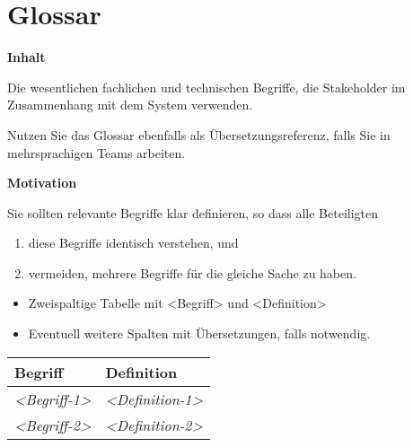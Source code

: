 \hypertarget{glossar}{%
\section{Glossar}\label{glossar}}

\textbf{Inhalt}

Die wesentlichen fachlichen und technischen Begriffe, die Stakeholder im
Zusammenhang mit dem System verwenden.

Nutzen Sie das Glossar ebenfalls als Übersetzungsreferenz, falls Sie in
mehrsprachigen Teams arbeiten.

\textbf{Motivation}

Sie sollten relevante Begriffe klar definieren, so dass alle Beteiligten

\begin{enumerate}
\def\labelenumi{\arabic{enumi}.}
\tightlist
\item
  diese Begriffe identisch verstehen, und
\item
  vermeiden, mehrere Begriffe für die gleiche Sache zu haben.
\end{enumerate}

\begin{itemize}
\tightlist
\item
  Zweispaltige Tabelle mit \textless Begriff\textgreater{} und
  \textless Definition\textgreater{}
\item
  Eventuell weitere Spalten mit Übersetzungen, falls notwendig.
\end{itemize}

\begin{longtable}[]{@{}ll@{}}
\toprule
Begriff & Definition\tabularnewline
\midrule
\endhead
\emph{\textless Begriff-1\textgreater{}} &
\emph{\textless Definition-1\textgreater{}}\tabularnewline
\emph{\textless Begriff-2\textgreater{}} &
\emph{\textless Definition-2\textgreater{}}\tabularnewline
\bottomrule
\end{longtable}
